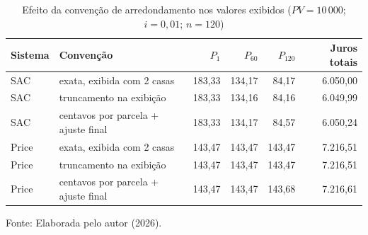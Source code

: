 \begin{table}[htb]
\centering
\small
\caption{Efeito da convenção de arredondamento nos valores exibidos ($PV=10\,000$; $i=0{,}01$; $n=120$)}
\label{tab:convencoes}
\begin{tabular}{llrrrr}
\hline
Sistema & Convenção & $P_1$ & $P_{60}$ & $P_{120}$ & Juros totais \\
\hline
SAC & exata, exibida com 2 casas & 183{,}33 & 134{,}17 & 84{,}17 & 6.050{,}00 \\
SAC & truncamento na exibição & 183{,}33 & 134{,}16 & 84{,}16 & 6.049{,}99 \\
SAC & centavos por parcela + ajuste final & 183{,}33 & 134{,}17 & 84{,}57 & 6.050{,}24 \\
Price & exata, exibida com 2 casas & 143{,}47 & 143{,}47 & 143{,}47 & 7.216{,}51 \\
Price & truncamento na exibição & 143{,}47 & 143{,}47 & 143{,}47 & 7.216{,}51 \\
Price & centavos por parcela + ajuste final & 143{,}47 & 143{,}47 & 143{,}68 & 7.216{,}61 \\
\hline
\end{tabular}
\par\vspace{0.1cm}
{\small Fonte: Elaborada pelo autor (2026).}
\end{table}
